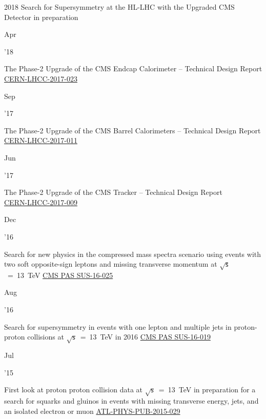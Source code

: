 \documentclass[]{cv} %
\begin{document}
\begin{entrylist}

  \entry
  {2018}
  {Search for Supersymmetry at the HL-LHC with the Upgraded CMS Detector}
  {in preparation}
  {\vspace*{\spacingPubs}}

  \entry
  {\parbox[t]{\parboxWidthOne}{Apr}\parbox[t]{\parboxWidthTwo}{\hfill '18}}
  {The Phase-2 Upgrade of the CMS Endcap Calorimeter -- Technical Design Report}
  {\href{https://cds.cern.ch/record/2293646}{CERN-LHCC-2017-023}}
  {\vspace*{\spacingPubs}}

  \entry
  {\parbox[t]{\parboxWidthOne}{Sep}\parbox[t]{\parboxWidthTwo}{\hfill '17}}
  {The Phase-2 Upgrade of the CMS Barrel Calorimeters -- Technical Design Report}
  {\href{https://cds.cern.ch/record/2283187}{CERN-LHCC-2017-011}}
  {\vspace*{\spacingPubs}}

  \entry
  {\parbox[t]{\parboxWidthOne}{Jun}\parbox[t]{\parboxWidthTwo}{\hfill '17}}
  {The Phase-2 Upgrade of the CMS Tracker -- Technical Design Report\\}
  {\href{https://cds.cern.ch/record/2272264}{CERN-LHCC-2017-009}}
  {\vspace*{\spacingPubs}}

  \entry
  {\parbox[t]{\parboxWidthOne}{Dec}\parbox[t]{\parboxWidthTwo}{\hfill '16}}
  {Search for new physics in the compressed mass spectra scenario using events with two soft opposite-sign leptons and missing transverse momentum at $\sqrt{\mathsf{s}}$~=~13~TeV}
  {\href{https://cds.cern.ch/record/2205866}{CMS PAS SUS-16-025}}
  {\vspace*{\spacingPubs}}

  \entry
  {\parbox[t]{\parboxWidthOne}{Aug}\parbox[t]{\parboxWidthTwo}{\hfill '16}}
  {Search for supersymmetry in events with one lepton and multiple jets in proton-proton collisions at $\sqrt{\mathsf{s}}$~=~13~TeV in 2016}
  {\href{https://cds.cern.ch/record/2204932}{CMS PAS SUS-16-019}}
  {\vspace*{\spacingPubs}}

  \entry
  {\parbox[t]{\parboxWidthOne}{Jul}\parbox[t]{\parboxWidthTwo}{\hfill '15}}
  {First look at proton proton collision data at $\sqrt{\mathsf{s}}$~=~13~TeV in
  preparation for a search for squarks and gluinos in events with missing
  transverse energy, jets, and an isolated electron or muon}
  {\href{https://cds.cern.ch/record/2037906}{ATL-PHYS-PUB-2015-029}}
  {\vspace*{\spacingPubs}}


\end{entrylist}
\end{document}
